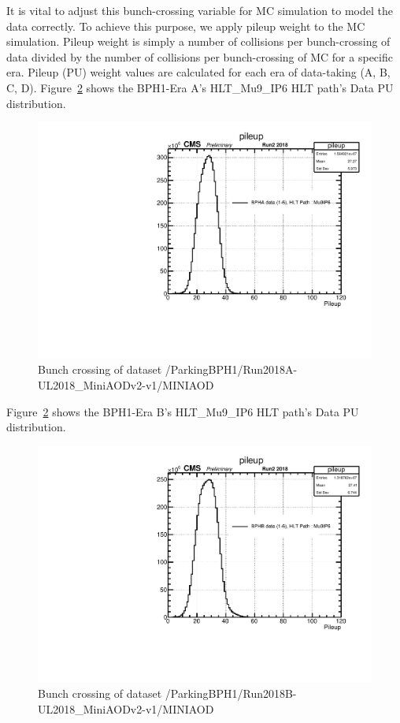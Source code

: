 It is vital to adjust this bunch-crossing variable for MC simulation to model the data correctly.
To achieve this purpose, we apply pileup weight to the MC simulation.
Pileup weight is simply a number of collisions per bunch-crossing of data divided by the number of collisions per bunch-crossing of MC for a specific era.
Pileup (PU) weight values are calculated for each era of data-taking (A, B, C, D).
Figure~\ref{fig:EraAData} shows the BPH1-Era A's HLT\_Mu9\_IP6 HLT path's Data PU distribution.
\begin{figure}[h!]
  \caption{Bunch crossing of dataset /ParkingBPH1/Run2018A-UL2018\_MiniAODv2-v1/MINIAOD}
  \label{fig:EraAData}
  \centering
  \includegraphics[width=0.67\linewidth]{figs/NVtx_BPHA.pdf}

\end{figure}

Figure~\ref{fig:EraAData} shows the BPH1-Era B's HLT\_Mu9\_IP6 HLT path's Data PU distribution.
\begin{figure}[h!]
  \caption{Bunch crossing of dataset /ParkingBPH1/Run2018B-UL2018\_MiniAODv2-v1/MINIAOD}
  \label{fig:EraAData}
  \centering
  \includegraphics[width=0.67\linewidth]{figs/NVtx_BPHB.pdf}

\end{figure}

